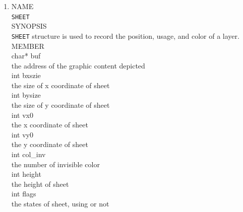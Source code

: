 \documentclass{swfcthesis}
\begin{document}
\begin{enumerate}
  \item
  NAME \\
  \hspace*{1cm}\texttt{SHEET} \\
  SYNOPSIS \\
  \hspace*{1cm}  \texttt{SHEET} structure is used to record the position,
usage, and color of a layer.\\
  MEMBER \\
  \hspace*{1cm} char* buf\\
  \hspace*{1.5cm}  the address of the graphic content depicted\\
  \hspace*{1cm} int bxszie\\
  \hspace*{1.5cm} the size of x coordinate of sheet\\
  \hspace*{1cm} int bysize\\
  \hspace*{1.5cm} the size of y coordinate of sheet\\
  \hspace*{1cm} int vx0\\
  \hspace*{1.5cm} the x coordinate of sheet\\
  \hspace*{1cm} int vy0\\
  \hspace*{1.5cm} the y coordinate of sheet\\
  \hspace*{1cm} int col\_inv\\
  \hspace*{1.5cm}  the number of invisible color\\
  \hspace*{1cm} int height\\
  \hspace*{1.5cm}  the height of sheet\\
  \hspace*{1cm} int flags\\
  \hspace*{1.5cm}  the states of sheet, using or not \\
  

\end{enumerate}
\end{document}
